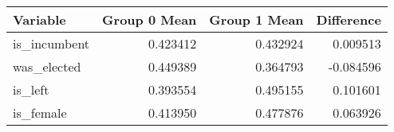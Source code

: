 \begin{tabular}{lrrr}
\toprule
Variable & Group 0 Mean & Group 1 Mean & Difference \\
\midrule
is_incumbent & 0.423412 & 0.432924 & 0.009513 \\
was_elected & 0.449389 & 0.364793 & -0.084596 \\
is_left & 0.393554 & 0.495155 & 0.101601 \\
is_female & 0.413950 & 0.477876 & 0.063926 \\
\bottomrule
\end{tabular}
